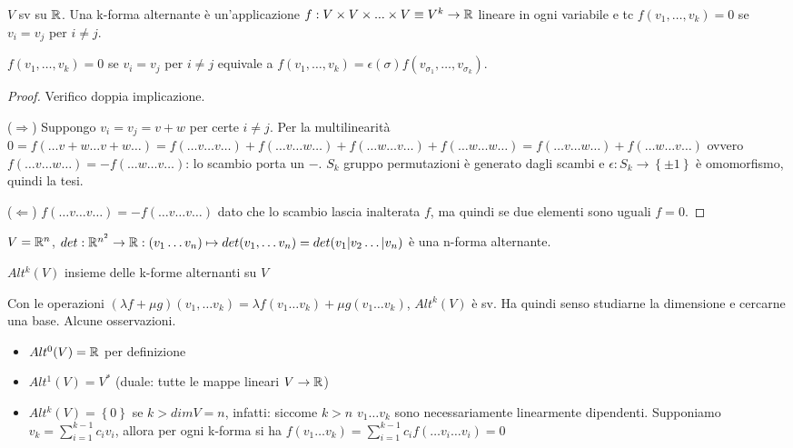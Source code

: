 \begin{definition}
    $V$ sv su $\mathbb{R}$. Una k-forma alternante è
    un'applicazione $f:V\times V\times ...\times V\equiv V^k\to\mathbb{R}$
    lineare in ogni variabile e tc $f(v_1,\dots,v_k)=0$ se
    $v_i=v_j$ per $i\neq j$.
\end{definition}
\begin{obs}
    $f(v_1,\dots,v_k)=0$ se $v_i=v_j$ per $i\neq j$ equivale a
    $f(v_1,\dots,v_k)=
    \epsilon(\sigma)f(v_{\sigma_1},\dots,v_{\sigma_k})$.
\end{obs}
\begin{proof}
    Verifico doppia implicazione.

    ($\Rightarrow$) Suppongo $v_i=v_j=v+w$ per certe $i\neq j$.
    Per la multilinearità $0=f(\dots v+w\dots v+w\dots)=
    f(\dots v\dots v\dots)+f(\dots v\dots w\dots)+
    f(\dots w\dots v\dots)+f(\dots w\dots w\dots)=
    f(\dots v\dots w\dots)+f(\dots w\dots v\dots)$ ovvero
    $f(\dots v\dots w\dots)=-f(\dots w\dots v\dots)$: lo scambio
    porta un $-$. $S_k$ gruppo permutazioni è generato dagli scambi
    e $\epsilon:S_k\to\left\{ \pm 1 \right\}$ è omomorfismo, quindi
    la tesi.

    ($\Leftarrow$) $f(\dots v\dots v\dots)=-f(\dots v\dots v\dots)$
    dato che lo scambio lascia inalterata $f$, ma quindi se due
    elementi sono uguali $f=0$.
\end{proof}

\begin{ex}
    $V=\mathbb{R}^n$, $det:\mathbb{R}^{n^2}\to\mathbb{R}:(v_1\dots v_n)\mapsto det(v_1,\dots
    v_n)=det(v_1|v_2\dots| v_n)$ è una n-forma alternante.
\end{ex}

\begin{definition}
    $Alt^k(V)$ insieme delle k-forme alternanti su $V$
\end{definition}
Con le operazioni $(\lambda f + \mu g)(v_1,\dots v_k)=\lambda
f(v_1\dots v_k)+ \mu g(v_1\dots v_k)$, $Alt^k(V)$ è sv.
Ha quindi senso studiarne la dimensione e cercarne una base. Alcune
osservazioni.
\begin{itemize}
    \item $Alt^0(V)=\mathbb{R}$ per definizione 
    \item $Alt^1(V)=V^*$ (duale: tutte le mappe lineari $V\to\mathbb{R}$)
    \item $Alt^k(V)=\left\{ 0 \right\}$ se $k>dimV=n$, infatti:
        siccome $k>n$ $v_1\dots v_k$ sono necessariamente
        linearmente dipendenti. Supponiamo $v_k=\sum_{i=1}^{k-1}c_i
        v_i$, allora per ogni k-forma si ha $f(v_1\dots
        v_k)=\sum_{i=1}^{k-1}c_i f(\dots v_i\dots v_i)=0$ 
\end{itemize}

